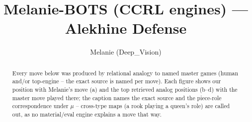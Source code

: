 \documentclass[11pt]{article}
\title{Melanie-BOTS (CCRL engines) — Alekhine Defense}
\author{Melanie (Deep\_Vision)}
\date{}
\begin{document}
\maketitle

\begin{abstract}Every move below was produced by relational analogy to named master games (human and/or top-engine -- the exact source is named per move). Each figure shows our position with Melanie's move (a) and the top retrieved analog positions (b--d) with the master move played there; the caption names the exact source and the piece-role correspondence under $\mu$ -- cross-type maps (a rook playing a queen's role) are called out, as no material/eval engine explains a move that way.\end{abstract}

\begin{figure}[p]\centering
\begin{subfigure}{0.46\textwidth}\centering
\resizebox{\linewidth}{!}{%
\newchessgame
\chessboard[
  setfen={rnbqk2r/ppp1ppbp/1n1p2p1/4P3/3P4/1B3N2/PPP2PPP/RNBQK2R w KQkq - 4 7},
  showmover=false,
  pgfstyle=straightmove, color=movearrow, markmove={f3-g5}
]}
\caption{}
\end{subfigure}\hfill
\begin{subfigure}{0.46\textwidth}\centering
\resizebox{\linewidth}{!}{%
\newchessgame
\chessboard[
  setfen={rnbqk2r/1pp1ppbp/1n1p2p1/p3P3/P2P4/1B3N2/1PP2PPP/RNBQK2R w KQkq - 0 8},
  showmover=false,
  pgfstyle=straightmove, color=movearrow, markmove={f3-g5}
]}
\caption{}
\end{subfigure}
\\[4pt]
\begin{subfigure}{0.46\textwidth}\centering
\resizebox{\linewidth}{!}{%
\newchessgame
\chessboard[
  setfen={rnbqk2r/1pp1ppbp/1n1p2p1/p3P3/P2P4/1B3N2/1PP2PPP/RNBQK2R w KQkq - 0 8},
  showmover=false,
  pgfstyle=straightmove, color=movearrow, markmove={f3-g5}
]}
\caption{}
\end{subfigure}\hfill
\begin{subfigure}{0.46\textwidth}\centering
\resizebox{\linewidth}{!}{%
\newchessgame
\chessboard[
  setfen={rnbqk2r/ppp1ppbp/1n1p2p1/4P3/2PP4/5N2/PP2BPPP/RNBQK2R w KQkq - 1 7},
  showmover=false,
  pgfstyle=straightmove, color=movearrow, markmove={e5-d6}
]}
\caption{}
\end{subfigure}

\end{figure}
\end{document}
